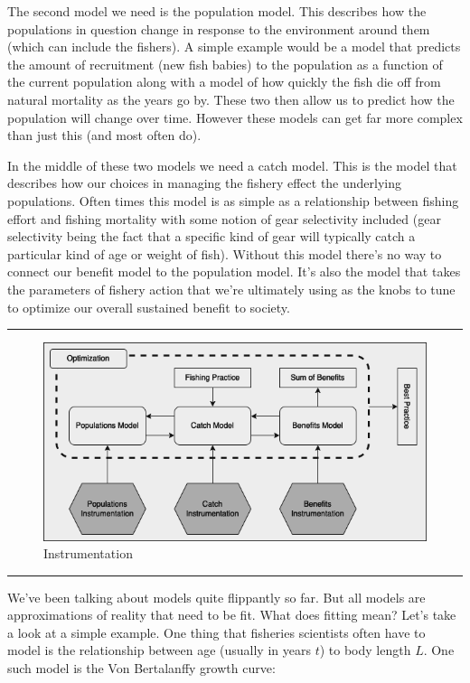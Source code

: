 \documentclass[11pt,a5paper]{book}
\begin{document}
The second model we need is the population model. This describes how the populations in question change in response to the environment around them (which can include the fishers). A simple example would be a model that predicts the amount of recruitment (new fish babies) to the population as a function of the current population along with a model of how quickly the fish die off from natural mortality as the years go by. These two then allow us to predict how the population will change over time. However these models can get far more complex than just this (and most often do). 
\newline

In the middle of these two models we need a catch model. This is the model that describes how our choices in managing the fishery effect the underlying populations. Often times this model is as simple as a relationship between fishing effort and fishing mortality with some notion of gear selectivity included (gear selectivity being the fact that a specific kind of gear will typically catch a particular kind of age or weight of fish). Without this model there's no way to connect our benefit model to the population model. It's also the model that takes the parameters of fishery action that we're ultimately using as the knobs to tune to optimize our overall sustained benefit to society. 
\newpage

\noindent \rule{\textwidth}{0.5pt} 
\begin{figure}[h!] 
  \includegraphics[width=\linewidth]{drawings/high_level_instrumentation.png}
  \caption{Instrumentation}
  \label{fig:high_level_instrumentation}
\end{figure}
\newline
\rule{\textwidth}{0.5pt} 
\vspace{5pt}

We've been talking about models quite flippantly so far. But all models are approximations of reality that need to be fit. What does fitting mean? Let's take a look at a simple example. One thing that fisheries scientists often have to model is the relationship between age (usually in years $t$) to body length $L$. One such model is the Von Bertalanffy growth curve:
\end{document}
